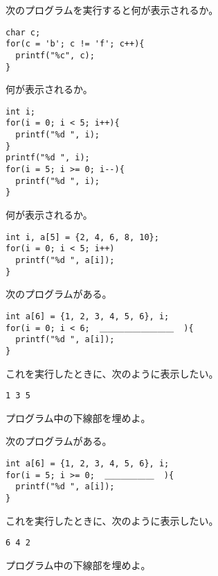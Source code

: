 \documentclass[12pt,a4j]{jarticle}
\newcounter{toi}
\def\toi{%
\bigskip\bigskip\noindent
\addtocounter{toi}{1}
\shadowbox{\bfseries\large 問\thetoi}
\nopagebreak[4]\bigskip\nopagebreak[4]
}
\begin{document}





\toi

次のプログラムを実行すると何が表示されるか。
\begin{verbatim}
char c;
for(c = 'b'; c != 'f'; c++){
  printf("%c", c);
}
\end{verbatim}




\toi

何が表示されるか。
\begin{verbatim}
int i;
for(i = 0; i < 5; i++){
  printf("%d ", i);
}
printf("%d ", i);
for(i = 5; i >= 0; i--){
  printf("%d ", i);
}
\end{verbatim}


\toi

何が表示されるか。
\begin{verbatim}
int i, a[5] = {2, 4, 6, 8, 10};
for(i = 0; i < 5; i++)
  printf("%d ", a[i]);
}
\end{verbatim}









\toi

次のプログラムがある。
\begin{verbatim}
int a[6] = {1, 2, 3, 4, 5, 6}, i;
for(i = 0; i < 6;  ＿＿＿＿＿＿＿＿＿  ){
  printf("%d ", a[i]);
}
\end{verbatim}
これを実行したときに、次のように表示したい。
\begin{verbatim}
1 3 5
\end{verbatim}
プログラム中の下線部を埋めよ。





\toi

次のプログラムがある。
\begin{verbatim}
int a[6] = {1, 2, 3, 4, 5, 6}, i;
for(i = 5; i >= 0;  ＿＿＿＿＿＿  ){
  printf("%d ", a[i]);
}
\end{verbatim}
これを実行したときに、次のように表示したい。
\begin{verbatim}
6 4 2
\end{verbatim}
プログラム中の下線部を埋めよ。
\end{document}

